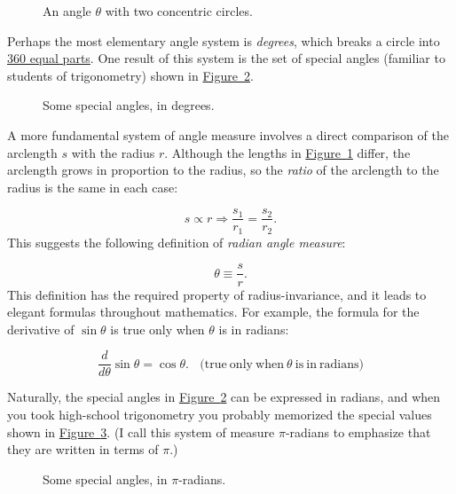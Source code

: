 \documentclass{article}
\begin{document}
\begin{figure}
\begin{center}
\end{center}
\caption{An angle $\theta$ with two concentric circles.\label{fig:angle_arclength}}
\end{figure}

Perhaps the most elementary angle system is \emph{degrees}, which breaks a circle into \href{http://www.wonderquest.com/circle.htm}{360 equal parts}. One result of this system is the set of special angles (familiar to students of trigonometry) shown in \hyperref[fig:degree_angles]{Figure~}\ref{fig:degree_angles}. 

\begin{figure}
\begin{center}
\end{center}
\caption{Some special angles, in degrees.\label{fig:degree_angles}}
\end{figure}

A more fundamental system of angle measure involves a direct comparison of the arclength $s$ with the radius $r$. Although the lengths in \hyperref[fig:angle_arclength]{Figure~}\ref{fig:angle_arclength} differ, the arclength grows in proportion to the radius, so the \emph{ratio} of the arclength to the radius is the same in each case:

\[
s\propto r \Rightarrow \frac{s_1}{r_1} = \frac{s_2}{r_2}.
\]
This suggests the following definition of \emph{radian angle measure}:

\[ \theta \equiv \frac{s}{r}. \]
This definition has the required property of radius-invariance, and it leads to elegant formulas throughout mathematics. For example, the formula for the derivative of $\sin\theta$ is true only when $\theta$ is in radians:

\[
  \frac{d}{d\theta}\sin\theta = \cos\theta. \mathrm{\ \ \ \ (true\ only\ when\ } \theta\mathrm{\ is\ in\ radians)}
\]

Naturally, the special angles in \hyperref[fig:degree_angles]{Figure~}\ref{fig:degree_angles} can be expressed in radians, and when you took high-school trigonometry you probably memorized the special values shown in \hyperref[fig:pi_angles]{Figure~}\ref{fig:pi_angles}. (I call this system of measure $\pi$-radians to emphasize that they are written in terms of $\pi$.)

\begin{figure}
\begin{center}
\end{center}
\caption{Some special angles, in $\pi$-radians.\label{fig:pi_angles}}
\end{figure}
\end{document}
